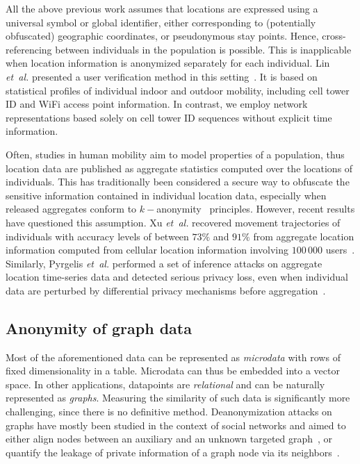All the above previous work assumes that locations are expressed using a universal symbol or global identifier, either corresponding to (potentially obfuscated) geographic coordinates, or pseudonymous stay points.
Hence, cross-referencing between individuals in the population is possible.
This is inapplicable when location information is anonymized separately for each individual.
Lin \emph{et~al.} presented a user verification method in this setting~\cite{LinMobile}.
It is based on statistical profiles of individual indoor and outdoor mobility, including cell tower ID and WiFi access point information.
In contrast, we employ network representations based solely on cell tower ID sequences without explicit time information.

Often, studies in human mobility aim to model properties of a population, thus location data are published as aggregate statistics computed over the locations of individuals.
This has traditionally been considered a secure way to obfuscate the sensitive information contained in individual location data, especially when released aggregates conform to $ k-$anonymity~\cite{sweeney2002k} principles.
However, recent results have questioned this assumption.
Xu \emph{et~al.} recovered movement trajectories of individuals with accuracy levels of between $73\%$ and $91\%$ from aggregate location information computed from cellular location information involving $100\,000$ users~\cite{xu2017trajectory}. Similarly, Pyrgelis \emph{et~al.} performed a set of inference attacks on aggregate location time-series data and detected serious privacy loss, even when individual data are perturbed by differential privacy mechanisms before aggregation~\cite{pyrgelis2017does}.

\subsection{Anonymity of graph data }
Most of the aforementioned data can be represented as \emph{microdata} with rows of fixed dimensionality in a table.
Microdata can thus be embedded into a vector space.
In other applications, datapoints are \emph{relational} and can be naturally represented as \emph{graphs}.
Measuring the similarity of such data is significantly more challenging, since there is no definitive method.
Deanonymization attacks on graphs have mostly been studied in the context of social networks and aimed to either align nodes between an auxiliary and an unknown targeted graph~\cite{narayanan2009anonymizing, sharad2014}, or quantify the leakage of private information of a graph node via its neighbors~\cite{zheleva09}.

